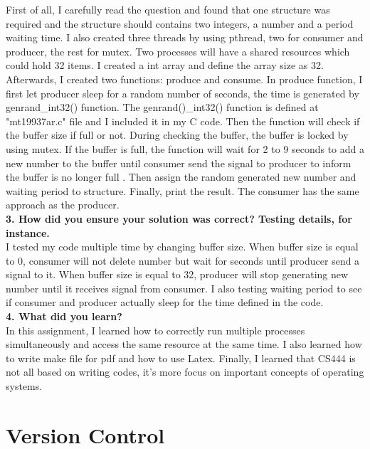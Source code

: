 \documentclass[10pt,letterpaper]{article}
\begin{document}
First of all, I carefully read the question and found that one structure was required and the structure should contains two integers, a number and a period waiting time. I also created three threads by using pthread, two for consumer and producer, the rest for mutex. Two processes will have a shared resources which could hold 32 items. I created a int array and define the array size as 32. Afterwards, I created two functions: produce and consume. In produce function, I first let producer sleep for a random number of seconds, the time is generated by genrand\_int32() function. The genrand()\_int32() function is defined at "mt19937ar.c" file and I included it in my C code. Then the function will check if the buffer size if full or not. During checking the buffer, the buffer is locked  by using mutex. If the buffer is full, the function will wait for 2 to 9 seconds to add a new number to the buffer until consumer send the signal to producer to inform the buffer is no longer full . Then assign the random generated new number and waiting period to structure. Finally, print the result. The consumer has the same approach as the producer.\\

\textbf{3. How did you ensure your solution was correct? Testing details, for instance.}\\

I tested my code multiple time by changing buffer size. When buffer size is equal to 0, consumer will not delete number but wait for seconds until producer send a signal to it. When buffer size is equal to 32, producer will stop generating new number until it receives signal from consumer. I also testing waiting period to see if consumer and producer actually sleep for the time defined in the code.\\

\textbf{4. What did you learn?}\\

In this assignment, I learned how to correctly run multiple processes simultaneously and access the same resource at the same time. I also learned how to write make file for pdf and how to use Latex. Finally, I learned that CS444 is not all based on writing codes, it's more focus on important concepts of operating systems.


\section{Version Control}

\textbf{}
\end{document}
